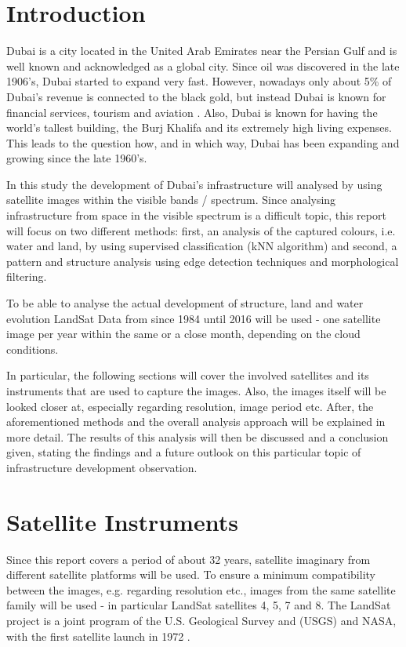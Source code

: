 \section{Introduction}
Dubai is a city located in the United Arab Emirates near the Persian Gulf and is well known and acknowledged as a global city. Since oil was discovered in the late 1906's, Dubai started to expand very fast. However, nowadays only about 5\% of Dubai's revenue is connected to the black gold, but instead Dubai is known for financial services, tourism and aviation \citep{wiki:dubai}. Also, Dubai is known for having the world's tallest building, the Burj Khalifa and its extremely high living expenses. This leads to the question how, and in which way, Dubai has been expanding and growing since the late 1960's.

In this study the development of Dubai's infrastructure will analysed by using satellite images within the visible bands / spectrum.
Since analysing infrastructure from space in the visible spectrum is a difficult topic, this report will focus on two different methods: first, an analysis of the captured colours, i.e. water and land, by using supervised classification (kNN algorithm) and second, a pattern and structure analysis using edge detection techniques and morphological filtering.

To be able to analyse the actual development of structure, land and water evolution LandSat Data from since 1984 until 2016 will be used - one satellite image per year within the same or a close month, depending  on the cloud conditions.

In particular, the following sections will cover the involved satellites and its instruments that are used to capture the images. Also, the images itself will be looked closer at, especially regarding resolution, image period etc. After, the aforementioned methods and the overall analysis approach will be explained in more detail. The results of this analysis will then  be discussed and a conclusion given, stating the findings and a future outlook on this particular topic of infrastructure development observation.

\section{Satellite Instruments}
Since this report covers a period of about 32 years, satellite imaginary from different satellite platforms will be used. To ensure a minimum compatibility between the images, e.g. regarding resolution etc., images from the same satellite family will be used - in particular LandSat satellites 4, 5, 7 and 8.
The LandSat project is a joint program of the U.S. Geological Survey and (USGS) and NASA, with the first satellite launch in 1972 \citep{pub:usgs}.

